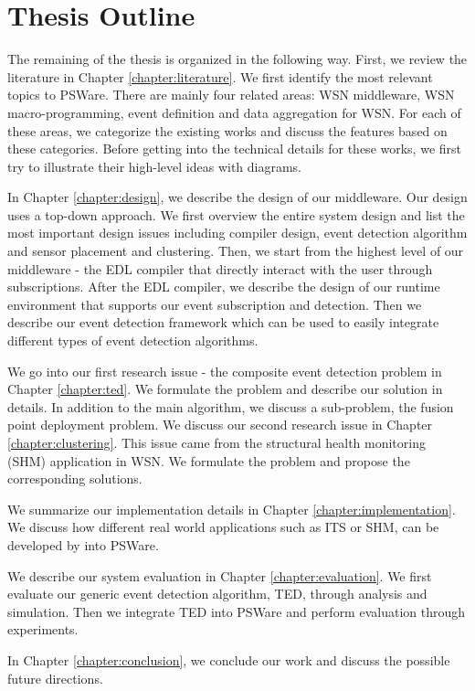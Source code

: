 \section{Thesis Outline}
\label{sec:introduction:outline}

The remaining of the thesis is organized in the following way. First, we review the literature in Chapter \ref{chapter:literature}. We first identify the most relevant topics to PSWare. There are mainly four related areas: WSN middleware, WSN macro-programming, event definition and data aggregation for WSN. For each of these areas, we categorize the existing works and discuss the features based on these categories. Before getting into the technical details for these works, we first try to illustrate their high-level ideas with diagrams.

In Chapter \ref{chapter:design}, we describe the design of our middleware. Our design uses a top-down approach. We first overview the entire system design and list the most important design issues including compiler design, event detection algorithm and sensor placement and clustering. Then, we start from the highest level of our middleware - the EDL compiler that directly interact with the user through subscriptions. After the EDL compiler, we describe the design of our runtime environment that supports our event subscription and detection. Then we describe our event detection framework which can be used to easily integrate different types of event detection algorithms.

We go into our first research issue - the composite event detection problem in Chapter \ref{chapter:ted}. We formulate the problem and describe our solution in details. In addition to the main algorithm, we discuss a sub-problem, the fusion point deployment problem. We discuss our second research issue in Chapter \ref{chapter:clustering}. This issue came from the structural health monitoring (SHM) application in WSN. We formulate the problem and propose the corresponding solutions.

We summarize our implementation details in Chapter \ref{chapter:implementation}. We discuss how different real world applications such as ITS or SHM, can be developed by into PSWare.

We describe our system evaluation in Chapter \ref{chapter:evaluation}. We first evaluate our generic event detection algorithm, TED, through analysis and simulation. Then we integrate TED into PSWare and perform evaluation through experiments.

In Chapter \ref{chapter:conclusion}, we conclude our work and discuss the possible future directions.